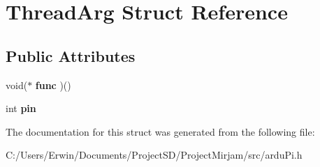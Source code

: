 \hypertarget{struct_thread_arg}{}\section{Thread\+Arg Struct Reference}
\label{struct_thread_arg}
\subsection*{Public Attributes}
\begin{DoxyCompactItemize}
\item 
\hypertarget{struct_thread_arg_a699dc083d8145068851102844204fd7d}{}void($\ast$ {\bfseries func} )()\label{struct_thread_arg_a699dc083d8145068851102844204fd7d}

\item 
\hypertarget{struct_thread_arg_a85ce9c4459ab1209c74847c74a661775}{}int {\bfseries pin}\label{struct_thread_arg_a85ce9c4459ab1209c74847c74a661775}

\end{DoxyCompactItemize}


The documentation for this struct was generated from the following file\+:\begin{DoxyCompactItemize}
\item 
C\+:/\+Users/\+Erwin/\+Documents/\+Project\+S\+D/\+Project\+Mirjam/src/ardu\+Pi.\+h\end{DoxyCompactItemize}
